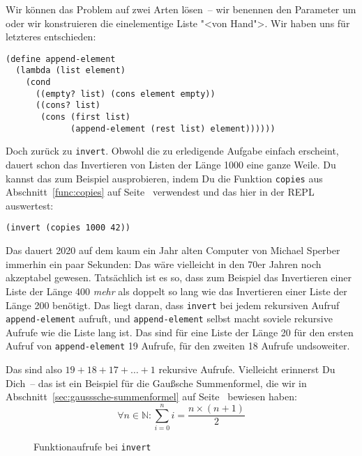 Wir können das Problem auf zwei Arten lösen~-- wir benennen den
Parameter um oder wir konstruieren die einelementige Liste "<von
Hand">.  Wir haben uns für letzteres entschieden:
%
\begin{lstlisting}
(define append-element
  (lambda (list element)
    (cond
      ((empty? list) (cons element empty))
      ((cons? list)
       (cons (first list)
             (append-element (rest list) element))))))
\end{lstlisting}

Doch zurück zu \lstinline{invert}.  Obwohl die zu erledigende Aufgabe
einfach erscheint, dauert schon das Invertieren von Listen der Länge
1000 eine ganze Weile.  Du kannst das zum Beispiel ausprobieren, indem
Du die Funktion \lstinline{copies} aus Abschnitt~\ref{func:copies} auf
Seite~\pageref{func:copies} verwendest und das hier in der REPL auswertest:
%
\begin{lstlisting}
(invert (copies 1000 42))
\end{lstlisting}
%
Das dauert 2020 auf dem kaum ein Jahr alten Computer von Michael
Sperber immerhin ein
paar Sekunden: Das wäre vielleicht in den 70er Jahren noch akzeptabel
gewesen.  Tatsächlich ist es so, dass zum Beispiel
das Invertieren einer Liste der Länge 400 \emph{mehr} als doppelt so
lang wie das Invertieren einer Liste der Länge 200 benötigt.  Das
liegt daran, dass \lstinline{invert} bei jedem rekursiven Aufruf
\lstinline{append-element} aufruft, und \lstinline{append-element} selbst
macht soviele rekursive Aufrufe wie die Liste lang ist. Das sind für
eine Liste der Länge 20 für den ersten Aufruf von
\lstinline{append-element} 19 Aufrufe, für den zweiten 18 Aufrufe
undsoweiter.

Das sind also $19+18+17+\ldots+1$ rekursive Aufrufe.  Vielleicht
erinnerst Du Dich~-- das ist ein Beispiel für die Gaußsche
Summenformel, die wir in Abschnitt~\ref{sec:gausssche-summenformel}
auf Seite~\pageref{sec:gausssche-summenformel} bewiesen haben:
%
\[\forall n\in\mathbb{N}: \sum_{i=0}^n i =
  \frac{n\times (n+1)}{2}\]
%
\begin{figure}[tb]
  \centering
{}
  \caption{Funktionaufrufe bei \lstinline{invert}}
  \label{fig:invert-calls}
\end{figure}

